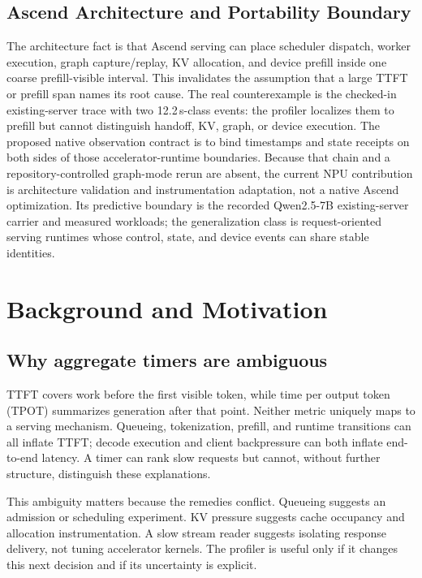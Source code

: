\documentclass[sigconf,screen,nonacm]{acmart}
\begin{document}
\subsection{Ascend Architecture and Portability Boundary}

The architecture fact is that Ascend serving can place scheduler dispatch,
worker execution, graph capture/replay, KV allocation, and device prefill inside
one coarse prefill-visible interval. This invalidates the assumption that a
large TTFT or prefill span names its root cause. The real counterexample is the
checked-in existing-server trace with two 12.2\,s-class events: the profiler
localizes them to prefill but cannot distinguish handoff, KV, graph, or device
execution. The proposed native observation contract is to bind timestamps and
state receipts on both sides of those accelerator-runtime boundaries. Because
that chain and a repository-controlled graph-mode rerun are absent, the current
NPU contribution is architecture validation and instrumentation adaptation,
not a native Ascend optimization. Its predictive boundary is the recorded
Qwen2.5-7B existing-server carrier and measured workloads; the generalization
class is request-oriented serving runtimes whose control, state, and device
events can share stable identities.

\section{Background and Motivation}

\subsection{Why aggregate timers are ambiguous}

TTFT covers work before the first visible token, while time per output token
(TPOT) summarizes generation after that point. Neither metric uniquely maps to
a serving mechanism. Queueing, tokenization, prefill, and runtime transitions
can all inflate TTFT; decode execution and client backpressure can both inflate
end-to-end latency. A timer can rank slow requests but cannot, without further
structure, distinguish these explanations.

This ambiguity matters because the remedies conflict. Queueing suggests an
admission or scheduling experiment. KV pressure suggests cache occupancy and
allocation instrumentation. A slow stream reader suggests isolating response
delivery, not tuning accelerator kernels. The profiler is useful only if it
changes this next decision and if its uncertainty is explicit.
\end{document}
